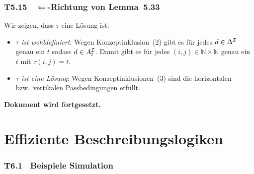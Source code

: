 \documentclass[fontsize=11pt, twoside=false, numbers=autoenddot]{scrbook}
\begin{document}
\section*{T5.15~ $\Leftarrow$-Richtung von Lemma~5.33}

Wir zeigen, dass $\tau$ eine Lösung ist: 
%
\begin{itemize}

  \item \emph{$\tau$ ist wohldefiniert}: Wegen
    Konzeptinklusion~(2) gibt es für jedes $d\in \Delta^\mathcal{I}$ genau
    ein $t$ sodass $d\in A_t^\mathcal{I}$. Damit gibt 
    es für jedes $(i,j)\in \mathbb{N}\times\mathbb{N}$ genau ein $t$
    mit $\tau(i,j)=t$.

  \item \emph{$\tau$ ist eine Lösung}: Wegen
    Konzeptinklusionen~(3) sind die horizontalen bzw.\ vertikalen
    Passbedingungen erfüllt. 

\end{itemize}


\bigskip\bigskip
\textbf{Dokument wird fortgesetzt.}

\parIII
\parIII
%
\part{Effiziente Beschreibungslogiken}

\section*{T6.1~ Beispiele Simulation}
\end{document}

